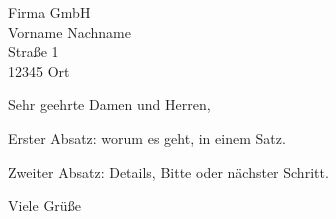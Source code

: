 \documentclass[version=last, fontsize=11pt, parskip=half]{scrlttr2}%
\begin{document}
\begin{letter}{%
  Firma GmbH\\
  Vorname Nachname\\
  Straße 1\\
  12345 Ort%
}

\opening{Sehr geehrte Damen und Herren,}

Erster Absatz: worum es geht, in einem Satz.

Zweiter Absatz: Details, Bitte oder nächster Schritt.

\closing{Viele Grüße}

\end{letter}
\end{document}
